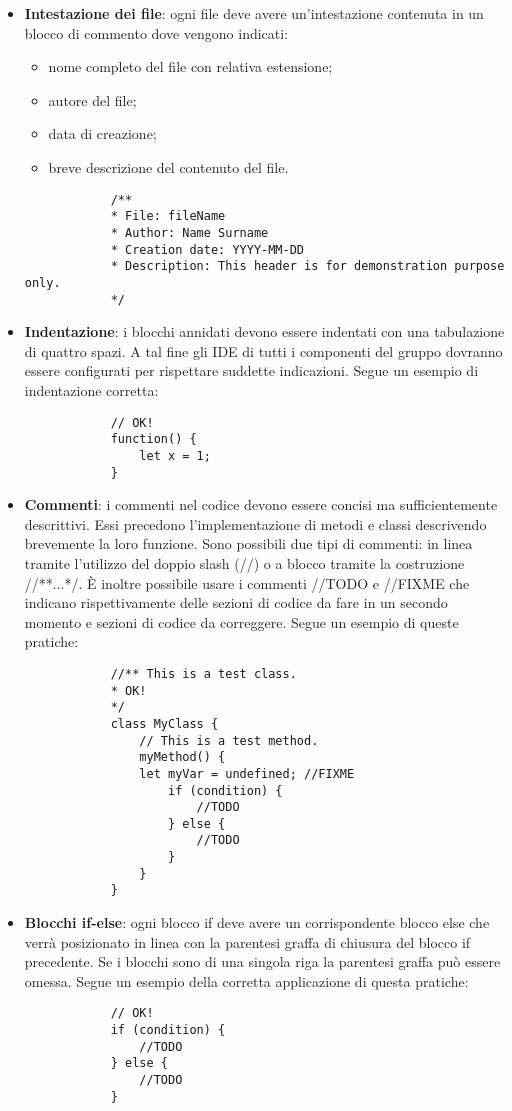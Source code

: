 \begin{itemize}
\begin{itemize}
				\end{itemize}
				\item \textbf{Intestazione dei file}: ogni file deve avere un'intestazione contenuta in un blocco di commento dove vengono indicati:
				\begin{itemize}
					\item nome completo del file con relativa estensione;
					\item autore del file;
					\item data di creazione;
					\item breve descrizione del contenuto del file.
				\end{itemize}
			\begin{verbatim}
			/**
			* File: fileName
			* Author: Name Surname
			* Creation date: YYYY-MM-DD
			* Description: This header is for demonstration purpose only.
			*/
			\end{verbatim}
				\item \textbf{Indentazione}: i blocchi annidati devono essere indentati con una tabulazione di quattro spazi. A tal fine gli IDE di tutti i componenti del gruppo dovranno essere configurati per rispettare suddette indicazioni. Segue un esempio di indentazione corretta:
			\begin{verbatim}
			// OK!
			function() {
			    let x = 1;
			}
			\end{verbatim}
				\item \textbf{Commenti}: i commenti nel codice devono essere concisi ma sufficientemente descrittivi. Essi precedono l'implementazione di metodi e classi descrivendo brevemente la loro funzione. Sono possibili due tipi di commenti: in linea tramite l'utilizzo del doppio slash (//) o a blocco tramite la costruzione //**...*/.  È inoltre possibile usare i commenti //TODO e //FIXME che indicano rispettivamente delle sezioni di codice da fare in un secondo momento e sezioni di codice da correggere. Segue un esempio di queste pratiche:
			\begin{verbatim}
			//** This is a test class.
			* OK!
			*/
			class MyClass {
			    // This is a test method.
			    myMethod() {
		        let myVar = undefined; //FIXME
			        if (condition) {
			            //TODO
			        } else {
			            //TODO
			        }
			    }
			}
			\end{verbatim}
				\item \textbf{Blocchi if-else}: ogni blocco if deve avere un corrispondente blocco else che verrà posizionato in linea con la parentesi graffa di chiusura del blocco if precedente. Se i blocchi sono di una singola riga la parentesi graffa può essere omessa. Segue un esempio della corretta applicazione di questa pratiche:
			\begin{verbatim}
			// OK!
			if (condition) {
			    //TODO
			} else {
			    //TODO
			}
			

\end{verbatim}
\end{itemize}
